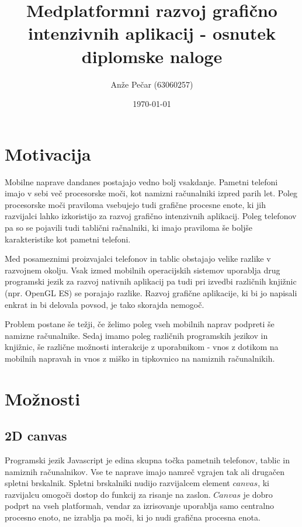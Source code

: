 \documentclass[a4paper,11pt]{article}
\title{Medplatformni razvoj grafično intenzivnih aplikacij - osnutek diplomske naloge}
\author{Anže Pečar (63060257)}
\date{\today}
\begin{document}
\maketitle

\section{Motivacija}

Mobilne naprave dandanes postajajo vedno bolj vsakdanje. Pametni telefoni imajo v sebi več procesorske moči, kot namizni računalniki izpred parih let. Poleg procesorske moči praviloma vsebujejo tudi grafične procesne enote, ki jih razvijalci lahko izkoristijo za razvoj grafično intenzivnih aplikacij. Poleg telefonov pa so se pojavili tudi tablični račnalniki, ki imajo praviloma še boljše karakteristike kot pametni telefoni. 

Med posameznimi proizvajalci telefonov in tablic obstajajo velike razlike v razvojnem okolju. Vsak izmed mobilnih operacijskih sistemov uporablja drug programski jezik za razvoj nativnih aplikacij pa tudi pri izvedbi različnih knjižnic (npr. OpenGL ES) se porajajo razlike. Razvoj grafične aplikacije, ki bi jo napisali enkrat in bi delovala povsod, je tako skorajda nemogoč.

Problem postane še težji, če želimo poleg vseh mobilnih naprav podpreti še namizne računalnike. Sedaj imamo poleg različnih programskih jezikov in knjižnic, še različne možnosti interakcije z uporabnikom - vnos z dotikom na mobilnih napravah in vnos z miško in tipkovnico na namiznih računalnikih.

\section{Možnosti}

\subsection{2D canvas\cite{canvas}}

Programski jezik Javascript je edina skupna točka pametnih telefonov, tablic in namiznih računalnikov. Vse te naprave imajo namreč vgrajen tak ali drugačen spletni brskalnik. Spletni brskalniki nudijo razvijalcem element $canvas$, ki razvijalcu omogoči dostop do funkcij za risanje na zaslon. $Canvas$ je dobro podprt na vseh platformah, vendar za izrisovanje uporablja samo centralno procesno enoto, ne izrablja pa moči, ki jo nudi grafična procesna enota.
\end{document}
